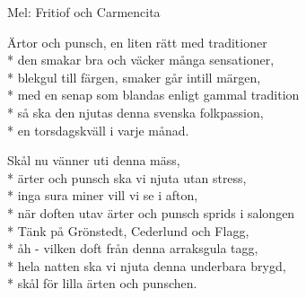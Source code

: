 \begin{SongText}
    \begin{SongInfo}
        Mel: Fritiof och Carmencita
    \end{SongInfo}
    \begin{SongVerse}
        Ärtor och punsch, en liten rätt med traditioner\\*%
        den smakar bra och väcker många sensationer,\\*%
        blekgul till färgen, smaker går intill märgen,\\*%
        med en senap som blandas enligt gammal tradition\\*%
        så ska den njutas denna svenska folkpassion,\\*%
        en torsdagskväll i varje månad.
    \end{SongVerse}
    \begin{SongVerse}
        Skål nu vänner uti denna mäss,\\*%
        ärter och punsch ska vi njuta utan stress,\\*%
        inga sura miner vill vi se i afton,\\*%
        när doften utav ärter och punsch sprids i salongen\\*%
        Tänk på Grönstedt, Cederlund och Flagg,\\*%
        åh - vilken doft från denna arraksgula tagg,\\*%
        hela natten ska vi njuta denna underbara brygd,\\*%
        skål för lilla ärten och punschen.
    \end{SongVerse}\end{SongText}
